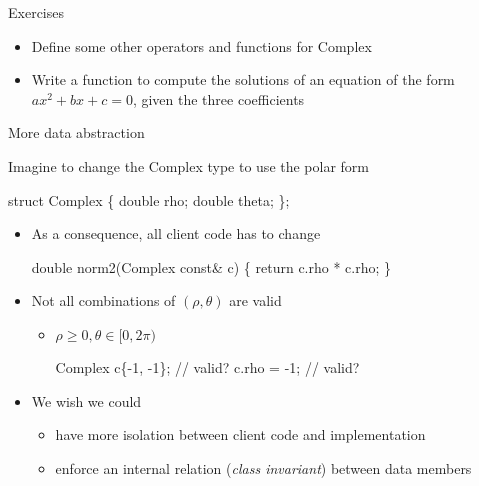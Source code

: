 \begin{frame}{Exercises}
  \begin{itemize}
  \item Define some other operators and functions for Complex
  \item Write a function to compute the solutions of an equation of the form
    $ax^2 + bx + c = 0$, given the three coefficients
  \end{itemize}
\end{frame}

\begin{frame}[fragile]{More data abstraction}

  Imagine to change the Complex type to use the polar form

  \begin{codeblock}
struct Complex \{
  double rho;
  double theta;
\};\end{codeblock}

  \begin{itemize}
  \item<2-> As a consequence, all client code has to change
    \begin{codeblock}
double norm2(Complex const& c) \{ return c.rho * c.rho; \}\end{codeblock}
  \item<3-> Not all combinations of $(\rho,\theta)$ are valid
    \begin{itemize}
    \item $\rho \geq 0, \theta \in [0, 2\pi)$
      \begin{codeblock}
Complex c\{-1, -1\}; // valid?
c.rho = -1;        // valid?\end{codeblock}
    \end{itemize}
  \end{itemize}

  \begin{itemize}
  \item<4-> We wish we could
    \begin{itemize}
    \item have more isolation between client code and implementation
    \item enforce an internal relation (\textit{class invariant}) between data
      members
    \end{itemize}
  \end{itemize}

\end{frame}

